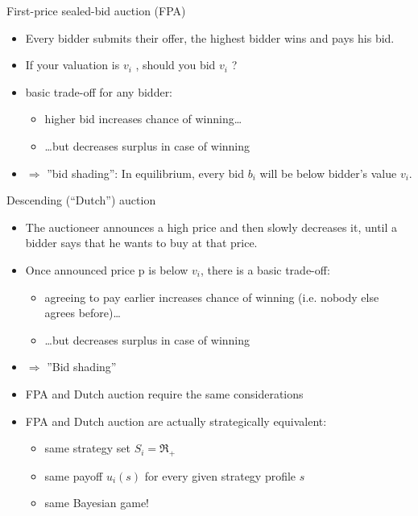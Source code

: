 \documentclass[bigger]{beamer}
\newcommand{\Ra}{\Rightarrow} \newcommand{\ra}{\rightarrow} \newcommand{\Lra}{\Leftrightarrow}
\begin{document}
\begin{frame}[label={sec:org1139fb1}]{First-price sealed-bid auction (FPA)}
\begin{itemize}
\item Every bidder submits their offer, the highest bidder wins and pays his bid.
\item If your valuation is \(v_i\) , should you bid \(v_i\) ?
\pause
\item basic trade-off for any bidder:
\begin{itemize}
\item higher bid increases chance of winning\ldots{}
\item \ldots{}but decreases surplus in case of winning
\end{itemize}
\item \(\Ra\) ”bid shading”: In equilibrium, every bid \(b_i\) will be below bidder’s value \(v_i\).
\end{itemize}
\end{frame}

\begin{frame}[label={sec:org067166d}]{Descending (“Dutch”) auction}
\begin{itemize}
\item The auctioneer announces a high price and then slowly decreases it, until a bidder says that he wants to buy at that price.
\item Once announced price p is below \(v_i\), there is a basic trade-off:
\begin{itemize}
\item agreeing to pay earlier increases chance of winning (i.e. nobody else agrees before)\ldots{}
\item \ldots{}but decreases surplus in case of winning
\end{itemize}
\item \(\Ra\) ”Bid shading”
\item FPA and Dutch auction require the same considerations
\item FPA and Dutch auction are actually strategically equivalent:
\begin{itemize}
\item same strategy set \(S_i=\Re_+\)
\item same payoff \(u_i(s)\) for every given strategy profile \(s\)
\item same Bayesian game!
\end{itemize}
\end{itemize}
\end{frame}
\end{document}

